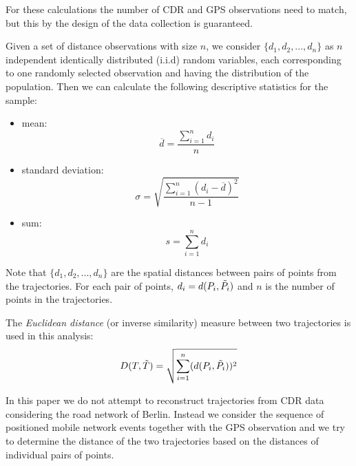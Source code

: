 For these calculations the number of CDR and GPS observations need to match, but this by the design of the data collection is guaranteed.

Given a set of distance observations with size $n$, we consider $\{d_{1}, d_{2}, ..., d_{n}\}$ as $n$ independent identically distributed (i.i.d) random variables, each corresponding to one randomly selected observation and having the distribution of the population. Then we can calculate the following descriptive statistics for the sample:
\begin{itemize}
    \item mean:
     \[ \overline {d} = \frac{\sum_{i=1}^{n} d_{i}}{n}\]
     \item standard deviation:
    \[ \sigma={\sqrt {\frac {\sum _{i=1}^{n}(d_{i}-{\overline {d}})^{2}}{n-1}}}\]
    \item sum:        
    \[s = \sum_{i=1}^{n} d_{i}\]
\end{itemize}

Note that $\{d_{1}, d_{2}, ..., d_{n}\}$ are the spatial distances between pairs of points from the trajectories. For each pair of points, $d_{i} = d(P_{i},\Tilde{P_{i}})$ and $n$ is the number of points in the trajectories.

The \textit{Euclidean distance} (or inverse similarity) measure between two trajectories is used in this analysis:
\[D(T,\Tilde{T}) = \sqrt{\sum_{i=1}^{n} (d(P_{i},\Tilde{P_{i}}))^{2}}\]

In this paper we do not attempt to reconstruct trajectories from CDR data considering the road network of Berlin. Instead we consider the sequence of positioned mobile network events together with the GPS observation and we try to determine the distance of the two trajectories based on the distances of individual pairs of points.




